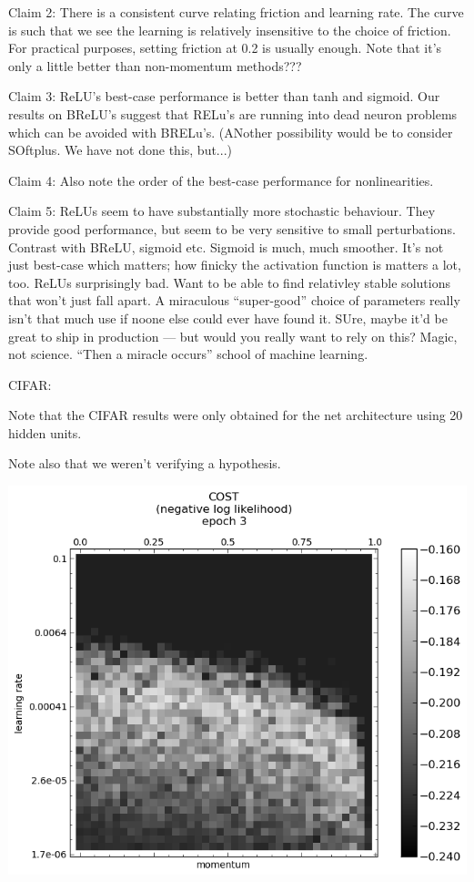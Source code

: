 \documentclass[10pt]{article}
\begin{document}
Claim 2: There is a consistent curve relating friction and learning
rate.  The curve is such that we see the learning is relatively
insensitive to the choice of friction.  For practical purposes,
setting friction at 0.2 is usually enough.  Note that it's only a
little better than non-momentum methods???

Claim 3: ReLU's best-case performance is better than tanh and sigmoid.
Our results on BReLU's suggest that RELu's are running into dead
neuron problems which can be avoided with BRELu's.  (ANother
possibility would be to consider SOftplus.  We have not done this,
but...)

Claim 4: Also note the order of the best-case performance for
nonlinearities.

Claim 5: ReLUs seem to have substantially more stochastic behaviour.
They provide good performance, but seem to be very sensitive to small
perturbations. Contrast with BReLU, sigmoid etc.  Sigmoid is much,
much smoother.  It's not just best-case which matters; how finicky the
activation function is matters a lot, too.  ReLUs surprisingly bad.
Want to be able to find relativley stable solutions that won't just
fall apart.  A miraculous ``super-good'' choice of parameters really
isn't that much use if noone else could ever have found it. SUre,
maybe it'd be great to ship in production --- but would you really
want to rely on this?  Magic, not science.  ``Then a miracle occurs''
school of machine learning.




CIFAR:

Note that the CIFAR results were only obtained for the net
architecture using 20 hidden units.

Note also that we weren't verifying a hypothesis.

\includegraphics[scale=0.5]{plots/detailed/LF-20R10R-20T10-CIFAR-3.png}
\end{document}
